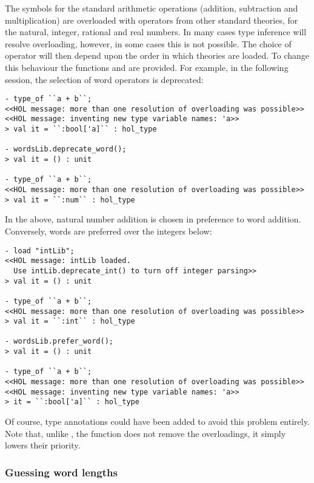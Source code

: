 The symbols for the standard arithmetic operations (addition, subtraction and multiplication) are overloaded with operators from other standard theories, \ie{} for the natural, integer, rational and real numbers.  In many cases type inference will resolve overloading, however, in some cases this is not possible.  The choice of operator will then depend upon the order in which theories are loaded.  To change this behaviour the functions  and  are provided.  For example, in the following session, the selection of word operators is deprecated:
\begin{session}
\begin{verbatim}
- type_of ``a + b``;
<<HOL message: more than one resolution of overloading was possible>>
<<HOL message: inventing new type variable names: 'a>>
> val it = ``:bool['a]`` : hol_type

- wordsLib.deprecate_word();
> val it = () : unit

- type_of ``a + b``;
<<HOL message: more than one resolution of overloading was possible>>
> val it = ``:num`` : hol_type
\end{verbatim}
\end{session}
In the above, natural number addition is chosen in preference to word addition.  Conversely, words are preferred over the integers below:
\begin{session}
\begin{verbatim}
- load "intLib";
<<HOL message: intLib loaded.
  Use intLib.deprecate_int() to turn off integer parsing>>
> val it = () : unit

- type_of ``a + b``;
<<HOL message: more than one resolution of overloading was possible>>
> val it = ``:int`` : hol_type

- wordsLib.prefer_word();
> val it = () : unit

- type_of ``a + b``;
<<HOL message: more than one resolution of overloading was possible>>
<<HOL message: inventing new type variable names: 'a>>
> it = ``:bool['a]`` : hol_type
\end{verbatim}
\end{session}
Of course, type annotations could have been added to avoid this problem entirely.  Note that, unlike , the function  does not remove the overloadings, it simply lowers their priority.

\subsubsection{Guessing word lengths}

